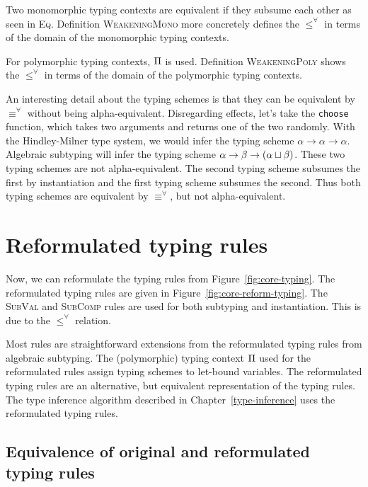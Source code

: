 Two monomorphic typing contexts are equivalent if they subsume each other as seen in \textsc{Eq}. Definition \textsc{WeakeningMono} more concretely defines the $\le^\forall$ in terms of the domain of the monomorphic typing contexts.

For polymorphic typing contexts, $\Pi$ is used. Definition \textsc{WeakeningPoly} shows the $\le^\forall$ in terms of the domain of the polymorphic typing contexts.

An interesting detail about the typing schemes is that they can be equivalent by $\equiv^\forall$ without being alpha-equivalent. Disregarding effects, let's take the \texttt{choose} function, which takes two arguments and returns one of the two randomly. With the Hindley-Milner type system, we would infer the typing scheme $\alpha \to \alpha \to \alpha$. Algebraic subtyping will infer the typing scheme $\alpha \to \beta \to (\alpha \sqcup \beta)$. These two typing schemes are not alpha-equivalent. The second typing scheme subsumes the first by instantiation and the first typing scheme subsumes the second. Thus both typing schemes are equivalent by $\equiv^\forall$, but not alpha-equivalent. 

\section{Reformulated typing rules}\label{reformulated}
Now, we can reformulate the typing rules from Figure~\ref{fig:core-typing}. The reformulated typing rules are given in Figure~\ref{fig:core-reform-typing}. The \textsc{SubVal} and \textsc{SubComp} rules are used for both subtyping and instantiation. This is due to the $\le^\forall$ relation. 

Most rules are straightforward extensions from the reformulated typing rules from algebraic subtyping. The (polymorphic) typing context $\Pi$ used for the reformulated rules assign typing schemes to let-bound variables. The reformulated typing rules are an alternative, but equivalent representation of the typing rules. The type inference algorithm described in Chapter~\ref{type-inference} uses the reformulated typing rules. 

\subsection{Equivalence of original and reformulated typing rules}


